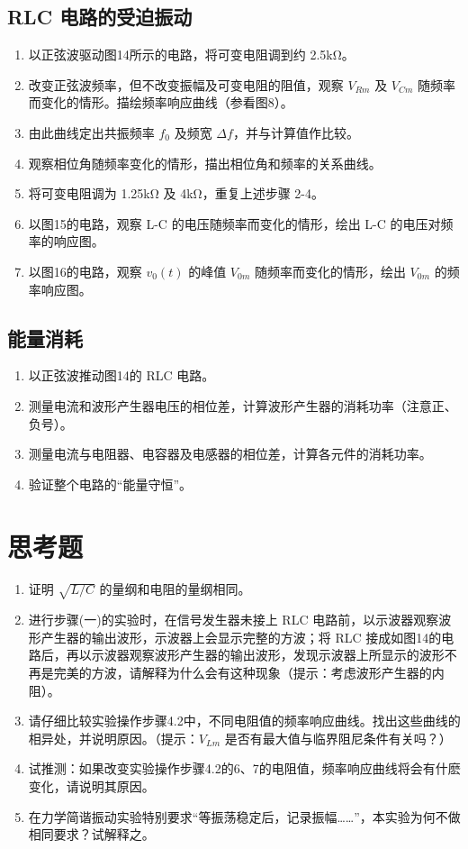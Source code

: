 \documentclass[UTF8]{article}
\begin{document}
\subsection{RLC 电路的受迫振动}
\begin{enumerate}
    \item 以正弦波驱动图14所示的电路，将可变电阻调到约 2.5kΩ。
    \item 改变正弦波频率，但不改变振幅及可变电阻的阻值，观察 \(V_{Rm}\) 及 \(V_{Cm}\) 随频率而变化的情形。描绘频率响应曲线（参看图8）。
    \item 由此曲线定出共振频率 \(f_0\) 及频宽 \(\Delta f\)，并与计算值作比较。
    \item 观察相位角随频率变化的情形，描出相位角和频率的关系曲线。
    \item 将可变电阻调为 1.25kΩ 及 4kΩ，重复上述步骤 2-4。
    \item 以图15的电路，观察 L-C 的电压随频率而变化的情形，绘出 L-C 的电压对频率的响应图。
    \item 以图16的电路，观察 \(v_0(t)\) 的峰值 \(V_{0m}\) 随频率而变化的情形，绘出 \(V_{0m}\) 的频率响应图。
\end{enumerate}

\subsection{能量消耗}
\begin{enumerate}
    \item 以正弦波推动图14的 RLC 电路。
    \item 测量电流和波形产生器电压的相位差，计算波形产生器的消耗功率（注意正、负号）。
    \item 测量电流与电阻器、电容器及电感器的相位差，计算各元件的消耗功率。
    \item 验证整个电路的“能量守恒”。
\end{enumerate}

\section{思考题}
\begin{enumerate}
    \item 证明 \( \sqrt{L/C} \) 的量纲和电阻的量纲相同。
    \item 进行步骤(一)的实验时，在信号发生器未接上 RLC 电路前，以示波器观察波形产生器的输出波形，示波器上会显示完整的方波；将 RLC 接成如图14的电路后，再以示波器观察波形产生器的输出波形，发现示波器上所显示的波形不再是完美的方波，请解释为什么会有这种现象（提示：考虑波形产生器的内阻）。
    \item 请仔细比较实验操作步骤4.2中，不同电阻值的频率响应曲线。找出这些曲线的相异处，并说明原因。（提示：\( V_{Lm} \) 是否有最大值与临界阻尼条件有关吗？）
    \item 试推测：如果改变实验操作步骤4.2的6、7的电阻值，频率响应曲线将会有什麽变化，请说明其原因。
    \item 在力学简谐振动实验特别要求“等振荡稳定后，记录振幅……”，本实验为何不做相同要求？试解释之。
\end{enumerate}
\end{document}
